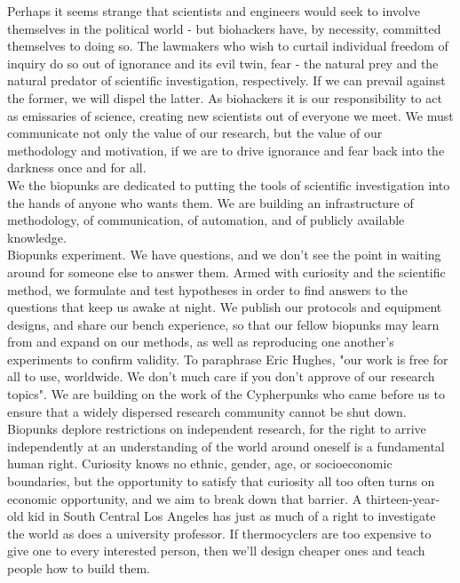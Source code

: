 \documentclass[11pt,twoside,a4paper]{book}
\begin{document}
\begin{center}
\begin{minipage}[ht]{0.95\textwidth}
	Perhaps it seems strange that scientists and engineers would seek to involve themselves in the political world - but biohackers have, by necessity, committed themselves to doing so. The lawmakers who wish to curtail individual freedom of inquiry do so out of ignorance and its evil twin, fear - the natural prey and the natural predator of scientific investigation, respectively. If we can prevail against the former, we will dispel the latter. As biohackers it is our responsibility to act as emissaries of science, creating new scientists out of everyone we meet. We must communicate not only the value of our research, but the value of our methodology and motivation, if we are to drive ignorance and fear back into the darkness once and for all. ~\\
	
	We the biopunks are dedicated to putting the tools of scientific investigation into the hands of anyone who wants them. We are building an infrastructure of methodology, of communication, of automation, and of publicly available knowledge. ~\\
	
	Biopunks experiment. We have questions, and we don't see the point in waiting around for someone else to answer them. Armed with curiosity and the scientific method, we formulate and test hypotheses in order to find answers to the questions that keep us awake at night. We publish our protocols and equipment designs, and share our bench experience, so that our fellow biopunks may learn from and expand on our methods, as well as reproducing one another's experiments to confirm validity. To paraphrase Eric Hughes, "our work is free for all to use, worldwide. We don't much care if you don't approve of our research topics". We are building on the work of the Cypherpunks who came before us to ensure that a widely dispersed research community cannot be shut down. ~\\
	
	Biopunks deplore restrictions on independent research, for the right to arrive independently at an understanding of the world around oneself is a fundamental human right. Curiosity knows no ethnic, gender, age, or socioeconomic boundaries, but the opportunity to satisfy that curiosity all too often turns on economic opportunity, and we aim to break down that barrier. A thirteen-year-old kid in South Central Los Angeles has just as much of a right to investigate the world as does a university professor. If thermocyclers are too expensive to give one to every interested person, then we'll design cheaper ones and teach people how to build them. ~\\
	

\end{minipage}
\end{center}
\end{document}

